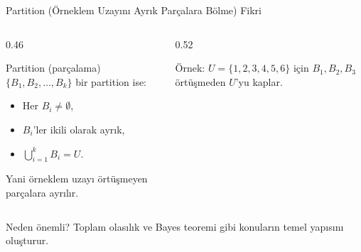 \documentclass[light]{lutbeamer}
\begin{document}
\begin{frame}{Partition (Örneklem Uzayını Ayrık Parçalara Bölme) Fikri}
    \begin{columns}[T]
        \begin{column}{0.46\textwidth}
            \begin{block}{Partition (parçalama)}
                $\{B_1,B_2,\dots,B_k\}$ bir partition ise:
                \begin{itemize}
                    \item Her $B_i\neq \emptyset$,
                    \item $B_i$'ler ikili olarak ayrık,
                    \item $\bigcup_{i=1}^k B_i=U$.
                \end{itemize}
                Yani örneklem uzayı örtüşmeyen parçalara ayrılır.
            \end{block}
        \end{column}
        \begin{column}{0.52\textwidth}
            \centering

            \vspace{0.12cm}
            {\tiny Örnek: $U=\{1,2,3,4,5,6\}$ için $B_1,B_2,B_3$ örtüşmeden $U$'yu kaplar.}
        \end{column}
    \end{columns}

    \vspace{0.3cm}
    \begin{block}{Neden önemli?}
        Toplam olasılık ve Bayes teoremi gibi konuların temel yapısını oluşturur.
    \end{block}
\end{frame}
\end{document}
